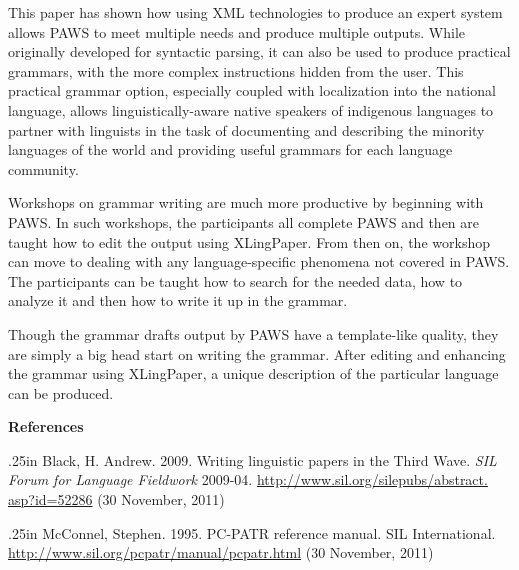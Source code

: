 \documentclass[12pt]{article}
\begin{document}
This paper has shown how using XML technologies to produce an expert system allows PAWS to meet multiple needs and produce multiple outputs. While originally developed for syntactic parsing, it can also be used to produce practical grammars, with the more complex instructions hidden from the user. This practical grammar option, especially coupled with localization into the national language, allows linguistically-aware native speakers of indigenous languages to partner with linguists in the task of documenting and describing the minority languages of the world and providing useful grammars for each language community.\par{}\indent Workshops on grammar writing are much more productive by beginning with PAWS. In such workshops, the participants all complete PAWS and then are taught how to edit the output using XLingPaper. From then on, the workshop can move to dealing with any language-specific phenomena not covered in PAWS. The participants can be taught how to search for the needed data, how to analyze it and then how to write it up in the grammar.\par{}\indent Though the grammar drafts output by PAWS have a template-like quality, they are simply a big head start on writing the grammar. After editing and enhancing the grammar using XLingPaper, a unique description of the particular language can be produced.\par{}{
\protect\hypertarget{rXLingPapReferences}{\vspace{24pt}\fontsize{14}{16.8}\selectfont \textbf{{\centering
References\\}}}
}\par{}
\vspace{12pt}\raggedright
\hangindent.25in\relax
{}\relax
\fontsize{10}{12}\selectfont \protect\hypertarget{rXLingPaper}{Black, H. Andrew.  2009.  }Writing linguistic papers in the Third Wave.  \textit{SIL Forum for Language Fieldwork }2009-04.    \href{http://www.sil.org/silepubs/abstract.asp?id=52286}{\textcolor[rgb]{0,0,0}{http://www.sil.org/​​silepubs/​​abstract.​asp?​id=52286}}  (30 November, 2011)\par
\hangindent.25in\relax
{}\relax
\fontsize{10}{12}\selectfont \protect\hypertarget{rMcConnel}{McConnel, Stephen.  1995.  }PC-PATR reference manual.  SIL International.    \href{http://www.sil.org/pcpatr/manual/pcpatr.html}{\textcolor[rgb]{0,0,0}{http://www.sil.org/​pcpatr/​​manual/​​pcpatr.html}}  (30 November, 2011)\par
\end{document}
